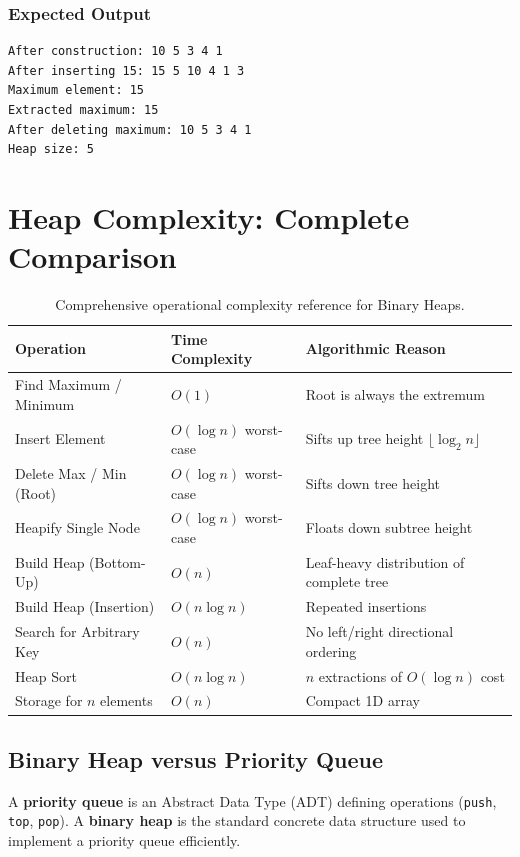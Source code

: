 \subsubsection{Expected Output}
\begin{lstlisting}[style=pseudocode]
After construction: 10 5 3 4 1
After inserting 15: 15 5 10 4 1 3
Maximum element: 15
Extracted maximum: 15
After deleting maximum: 10 5 3 4 1
Heap size: 5
\end{lstlisting}

\section{Heap Complexity: Complete Comparison}

\begin{table}[htbp]
\centering
\small
\begin{tabularx}{\textwidth}{l X X}
\toprule
\textbf{Operation} & \textbf{Time Complexity} & \textbf{Algorithmic Reason} \\
\midrule
Find Maximum / Minimum    & $O(1)$                    & Root is always the extremum \\
Insert Element            & $O(\log n)$ worst-case    & Sifts up tree height $\lfloor \log_2 n \rfloor$ \\
Delete Max / Min (Root)   & $O(\log n)$ worst-case    & Sifts down tree height \\
Heapify Single Node       & $O(\log n)$ worst-case    & Floats down subtree height \\
Build Heap (Bottom-Up)    & $O(n)$                    & Leaf-heavy distribution of complete tree \\
Build Heap (Insertion)    & $O(n \log n)$             & Repeated insertions \\
Search for Arbitrary Key  & $O(n)$                    & No left/right directional ordering \\
Heap Sort                 & $O(n \log n)$             & $n$ extractions of $O(\log n)$ cost \\
Storage for $n$ elements  & $O(n)$                    & Compact 1D array \\
\bottomrule
\end{tabularx}
\caption{Comprehensive operational complexity reference for Binary Heaps.}
\end{table}

\subsection{Binary Heap versus Priority Queue}
A \textbf{priority queue} is an Abstract Data Type (ADT) defining operations (\texttt{push}, \texttt{top}, \texttt{pop}). A \textbf{binary heap} is the standard concrete data structure used to implement a priority queue efficiently.

